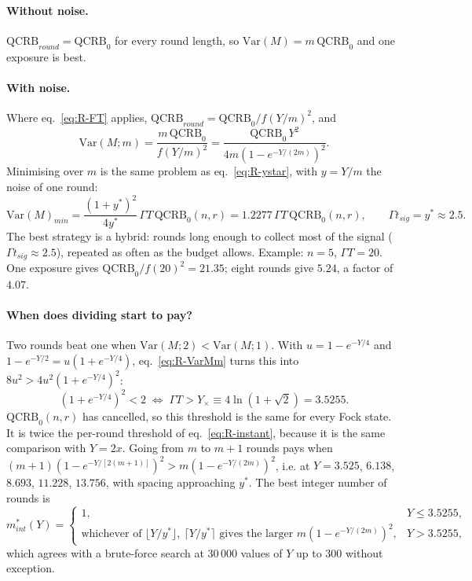 \paragraph{Without noise.} $\mathrm{QCRB}_{round} = \mathrm{QCRB}_0$ for every round length, so $\mathrm{Var}(M) = m\,\mathrm{QCRB}_0$ and one exposure is best.

\paragraph{With noise.} Where eq.~\eqref{eq:R-FT} applies, $\mathrm{QCRB}_{round} = \mathrm{QCRB}_0/f(Y/m)^2$, and
\begin{equation}
\label{eq:R-VarMm}
    \mathrm{Var}(M; m) = \frac{m\,\mathrm{QCRB}_0}{f(Y/m)^2} = \frac{\mathrm{QCRB}_0\,Y^2}{4m\left(1 - e^{-Y/(2m)}\right)^2}.
\end{equation}
Minimising over $m$ is the same problem as eq.~\eqref{eq:R-ystar}, with $y = Y/m$ the noise of one round:
\begin{equation}
\label{eq:R-floor}
    \mathrm{Var}(M)_{min} = \frac{(1 + y^*)^2}{4y^*}\,\Gamma T\,\mathrm{QCRB}_0(n, r) = 1.2277\,\Gamma T\,\mathrm{QCRB}_0(n, r),
    \qquad
    \Gamma t_{sig} = y^* \approx 2.5 .
\end{equation}
The best strategy is a hybrid: rounds long enough to collect most of the signal ($\Gamma t_{sig} \approx 2.5$), repeated as often as the budget allows. Example: $n = 5$, $\Gamma T = 20$. One exposure gives $\mathrm{QCRB}_0/f(20)^2 = 21.35$; eight rounds give $5.24$, a factor of $4.07$.

\paragraph{When does dividing start to pay?} Two rounds beat one when $\mathrm{Var}(M;2) < \mathrm{Var}(M;1)$. With $u = 1 - e^{-Y/4}$ and $1 - e^{-Y/2} = u(1 + e^{-Y/4})$, eq.~\eqref{eq:R-VarMm} turns this into $8u^2 > 4u^2(1 + e^{-Y/4})^2$:
\begin{equation}
\label{eq:R-Ycross}
    \left(1 + e^{-Y/4}\right)^2 < 2
    \;\Longleftrightarrow\;
    \Gamma T > Y_\times \equiv 4\ln(1 + \sqrt{2}) = 3.5255 .
\end{equation}
$\mathrm{QCRB}_0(n, r)$ has cancelled, so this threshold is the same for every Fock state. It is twice the per-round threshold of eq.~\eqref{eq:R-instant}, because it is the same comparison with $Y = 2x$. Going from $m$ to $m+1$ rounds pays when $(m+1)(1 - e^{-Y/[2(m+1)]})^2 > m(1 - e^{-Y/(2m)})^2$, i.e. at $Y = 3.525$, $6.138$, $8.693$, $11.228$, $13.756$, with spacing approaching $y^*$. The best integer number of rounds is
\begin{equation}
\label{eq:R-mint}
    m^*_{int}(Y) =
    \begin{cases}
        1, & Y \le 3.5255, \\
        \text{whichever of } \lfloor Y/y^*\rfloor,\ \lceil Y/y^*\rceil \text{ gives the larger } m\left(1 - e^{-Y/(2m)}\right)^2, & Y > 3.5255,
    \end{cases}
\end{equation}
which agrees with a brute-force search at $30\,000$ values of $Y$ up to $300$ without exception.

